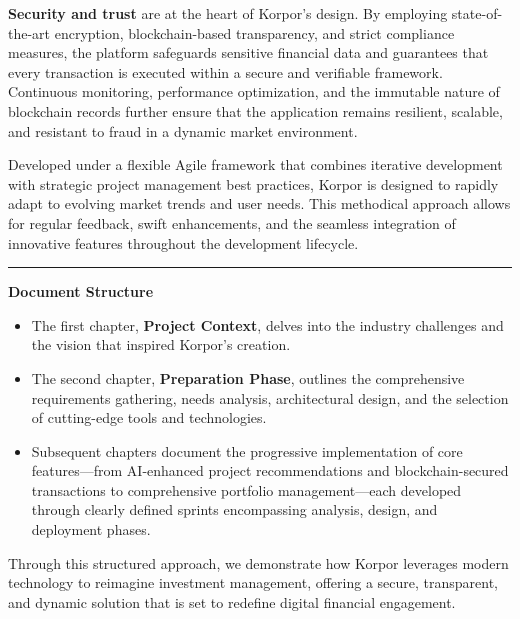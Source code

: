 \vspace{0.1cm}
\noindent \textbf{\textcolor{primary}{Security and trust}} are at the heart of Korpor's design. By employing state-of-the-art encryption, blockchain-based transparency, and strict compliance measures, the platform safeguards sensitive financial data and guarantees that every transaction is executed within a secure and verifiable framework. Continuous monitoring, performance optimization, and the immutable nature of blockchain records further ensure that the application remains resilient, scalable, and resistant to fraud in a dynamic market environment.

\vspace{0.1cm}
\noindent Developed under a flexible Agile framework that combines iterative development with strategic project management best practices, Korpor is designed to rapidly adapt to evolving market trends and user needs. This methodical approach allows for regular feedback, swift enhancements, and the seamless integration of innovative features throughout the development lifecycle.

\vspace{0.1cm}
\begin{center}
\textcolor{primary}{\rule{0.3\textwidth}{0.4pt}}
\end{center}
\vspace{0.1cm}

\noindent \textbf{\textcolor{primary}{Document Structure}}

\vspace{-0.3cm} %
\begin{itemize}[leftmargin=1.5em, itemsep=0pt, parsep=0pt, topsep=0.1cm]
\item The first chapter, \textbf{\textcolor{primary}{Project Context}}, delves into the industry challenges and the vision that inspired Korpor's creation.
\item The second chapter, \textbf{\textcolor{primary}{Preparation Phase}}, outlines the comprehensive requirements gathering, needs analysis, architectural design, and the selection of cutting-edge tools and technologies.
\item Subsequent chapters document the progressive implementation of core features—from AI-enhanced project recommendations and blockchain-secured transactions to comprehensive portfolio management—each developed through clearly defined sprints encompassing analysis, design, and deployment phases.
\end{itemize}

\vspace{0.1cm}
\noindent Through this structured approach, we demonstrate how Korpor leverages modern technology to reimagine investment management, offering a secure, transparent, and dynamic solution that is set to redefine digital financial engagement.

\endgroup %
\enlargethispage{3cm} %